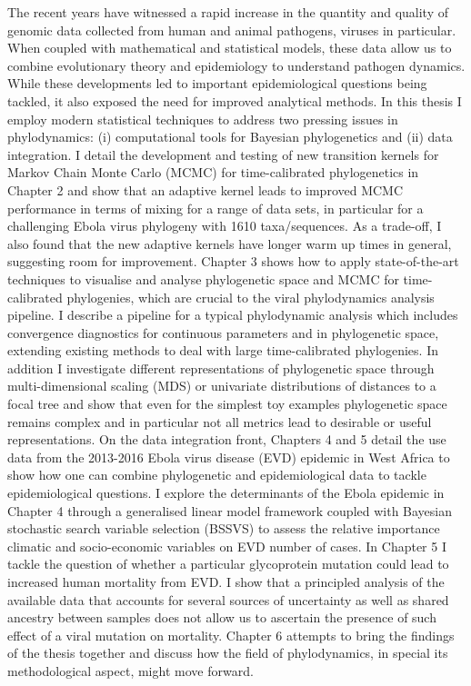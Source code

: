 The recent years have witnessed a rapid increase in the quantity and quality of genomic data collected from human and animal pathogens, viruses in particular.
When coupled with mathematical and statistical models, these data allow us to combine evolutionary theory and epidemiology to understand pathogen dynamics.
While these developments led to important epidemiological questions being tackled, it also exposed the need for improved analytical methods.
In this thesis I employ modern statistical techniques to address two pressing issues in phylodynamics: (i) computational tools for Bayesian phylogenetics and (ii) data integration.
I detail the development and testing of new transition kernels for Markov Chain Monte Carlo (MCMC) for time-calibrated phylogenetics in Chapter 2 and show that an adaptive kernel leads to improved MCMC performance in terms of mixing for a range of data sets, in particular for a challenging Ebola virus phylogeny with 1610 taxa/sequences.
As a trade-off, I also found that the new adaptive kernels have longer warm up times in general, suggesting room for improvement.
Chapter 3 shows how to apply state-of-the-art techniques to visualise and analyse phylogenetic space and MCMC for time-calibrated phylogenies, which are crucial to the viral phylodynamics analysis pipeline.
I describe a pipeline for a typical phylodynamic analysis which includes convergence diagnostics for continuous parameters and in phylogenetic space, extending existing methods to deal with large time-calibrated phylogenies.
In addition I investigate different representations of phylogenetic space through multi-dimensional scaling (MDS) or univariate distributions of distances to a focal tree and show that even for the simplest toy examples phylogenetic space remains complex and in particular not all metrics lead to desirable or useful representations.
On the data integration front, Chapters 4 and 5 detail the use data from the 2013-2016 Ebola virus disease (EVD) epidemic in West Africa to show how one can combine phylogenetic and epidemiological data to tackle epidemiological questions.
I explore the determinants of the Ebola epidemic in Chapter 4 through a generalised linear model framework coupled with Bayesian stochastic search variable selection (BSSVS) to assess the relative importance climatic and socio-economic variables on EVD number of cases.
In Chapter 5 I tackle the question of whether a particular glycoprotein mutation could lead to increased  human mortality from EVD.
I show that a principled analysis of the available data that accounts for several sources of uncertainty as well as shared ancestry between samples does not allow us to ascertain the presence of such effect of a viral mutation on mortality.
Chapter 6 attempts to bring the findings of the thesis together and discuss how the field of phylodynamics, in special its methodological aspect, might move forward.